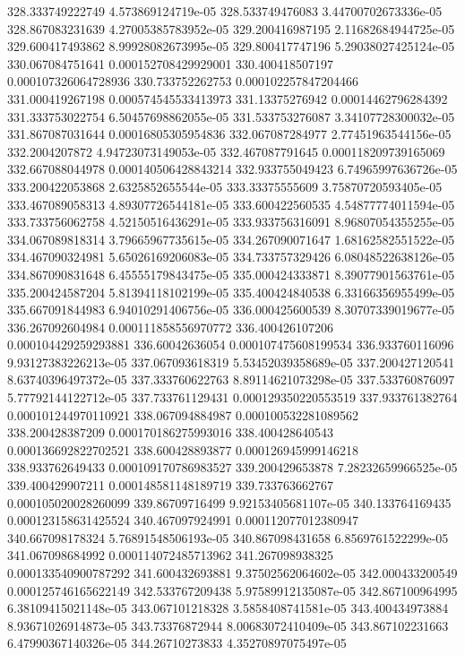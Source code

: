 {328.333749222749 4.573869124719e-05
328.533749476083 3.44700702673336e-05
328.867083231639 4.27005385783952e-05
329.200416987195 2.11682684944725e-05
329.600417493862 8.99928082673995e-05
329.800417747196 5.29038027425124e-05
330.067084751641 0.000152708429929001
330.400418507197 0.000107326064728936
330.733752262753 0.000102257847204466
331.000419267198 0.000574545533413973
331.13375276942 0.00014462796284392
331.333753022754 6.50457698862055e-05
331.533753276087 3.34107728300032e-05
331.867087031644 0.00016805305954836
332.067087284977 2.77451963544156e-05
332.2004207872 4.94723073149053e-05
332.467087791645 0.000118209739165069
332.667088044978 0.000140506428843214
332.933755049423 6.74965997636726e-05
333.200422053868 2.6325852655544e-05
333.33375555609 3.75870720593405e-05
333.467089058313 4.89307726544181e-05
333.600422560535 4.54877774011594e-05
333.733756062758 4.52150516436291e-05
333.933756316091 8.96807054355255e-05
334.067089818314 3.79665967735615e-05
334.267090071647 1.68162582551522e-05
334.467090324981 5.65026169206083e-05
334.733757329426 6.08048522638126e-05
334.867090831648 6.45555179843475e-05
335.000424333871 8.39077901563761e-05
335.200424587204 5.81394118102199e-05
335.400424840538 6.33166356955499e-05
335.667091844983 6.94010291406756e-05
336.000425600539 8.30707339019677e-05
336.267092604984 0.000111858556970772
336.400426107206 0.000104429259293881
336.60042636054 0.000107475608199534
336.933760116096 9.93127383226213e-05
337.067093618319 5.53452039358689e-05
337.200427120541 8.63740396497372e-05
337.333760622763 8.89114621073298e-05
337.533760876097 5.77792144122712e-05
337.733761129431 0.000129350220553519
337.933761382764 0.000101244970110921
338.067094884987 0.000100532281089562
338.200428387209 0.000170186275993016
338.400428640543 0.000136692822702521
338.600428893877 0.000126945999146218
338.933762649433 0.000109170786983527
339.200429653878 7.28232659966525e-05
339.400429907211 0.000148581148189719
339.733763662767 0.000105020028260099
339.86709716499 9.92153405681107e-05
340.133764169435 0.000123158631425524
340.467097924991 0.000112077012380947
340.667098178324 5.76891548506193e-05
340.867098431658 6.8569761522299e-05
341.067098684992 0.000114072485713962
341.267098938325 0.000133540900787292
341.600432693881 9.37502562064602e-05
342.000433200549 0.000125746165622149
342.533767209438 5.97589912135087e-05
342.867100964995 6.38109415021148e-05
343.067101218328 3.5858408741581e-05
343.400434973884 8.93671026914873e-05
343.73376872944 8.00683072410409e-05
343.867102231663 6.47990367140326e-05
344.26710273833 4.35270897075497e-05
}
